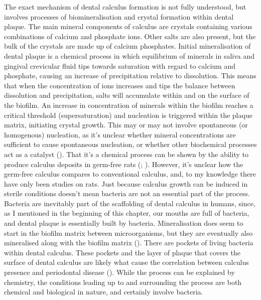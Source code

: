 \documentclass[
  b5paper,
]{book}
\begin{document}
The exact mechanism of dental calculus formation is not fully
understood, but involves processes of biomineralisation and crystal
formation within dental plaque. The main mineral components of calculus
are crystals containing various combinations of calcium and phosphate
ions. Other salts are also present, but the bulk of the crystals are
made up of calcium phosphates. Initial mineralisation of dental plaque
is a chemical process in which equilibrium of minerals in saliva and
gingival crevicular fluid tips towards saturation with regard to calcium
and phosphate, causing an increase of precipitation relative to
dissolution. This means that when the concentration of ions increases
and tips the balance between dissolution and precipitation, salts will
accumulate within and on the surface of the biofilm. An increase in
concentration of minerals within the biofilm reaches a critical
threshold (supersaturation) and nucleation is triggered within the
plaque matrix, initiating crystal growth. This may or may not involve
spontaneous (or homogenous) nucleation, as it's unclear whether mineral
concentrations are sufficient to cause spontaneous nucleation, or
whether other biochemical processes act as a catalyst
(). That
it's a chemical process can be shown by the ability to produce calculus
deposits in germ-free rats
(;
).
However, it's unclear how the germ-free calculus compares to
conventional calculus, and, to my knowledge there have only been studies
on rats. Just because calculus growth can be induced in sterile
conditions doesn't mean bacteria are not an essential part of the
process. Bacteria are inevitably part of the scaffolding of dental
calculus in humans, since, as I mentioned in the beginning of this
chapter, our mouths are full of bacteria, and dental plaque is
essentially built by bacteria. Mineralisation does seem to start in the
biofilm matrix between microorganisms, but they are eventually also
mineralised along with the biofilm matrix
(). There are pockets of living bacteria within dental calculus.
These pockets and the layer of plaque that covers the surface of dental
calculus are likely what cause the correlation between calculus presence
and periodontal disease (). While the process can be explained by chemistry,
the conditions leading up to and surrounding the process are both
chemical and biological in nature, and certainly involve bacteria.
\end{document}
